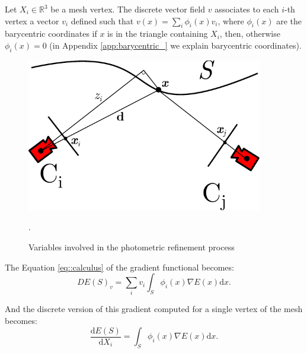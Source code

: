 Let $X_i \in \mathbb{R}^3$ be a mesh vertex. The discrete vector field $v$ associates to each $i$-th vertex a vector $v_i$ defined such that $v(x) = \sum_i \phi_i(x) v_i$, where $\phi_i(x)$ are the barycentric coordinates if $x$ is in the triangle containing $X_i$, then,  otherwise $\phi_i(x) = 0$ (in Appendix \ref{app:barycentric_} we explain barycentric coordinates).


\begin{figure}[t]
\centering
\includegraphics[width=0.92\textwidth]{./img/ch-incr-dens/cameproj}
\caption{Variables involved in the photometric refinement process}.
\label{fig:cameraproj}
\end{figure}

The Equation \eqref{eq::calculus} of the gradient functional becomes:
\begin{equation}
  DE(\mathit{S})_v = \sum_i v_i \int_{\mathit{S}} \phi_i(x) \nabla E(x) \textrm{d}x.
\end{equation}

And the discrete version of this gradient computed for a single vertex of the mesh becomes:
\begin{equation}
  \frac{\textrm{d}E(\mathit{S})}{\textrm{d}X_i} =  \int_{\mathit{S}} \phi_i(x) \nabla E(x) \textrm{d}x.
\end{equation}

